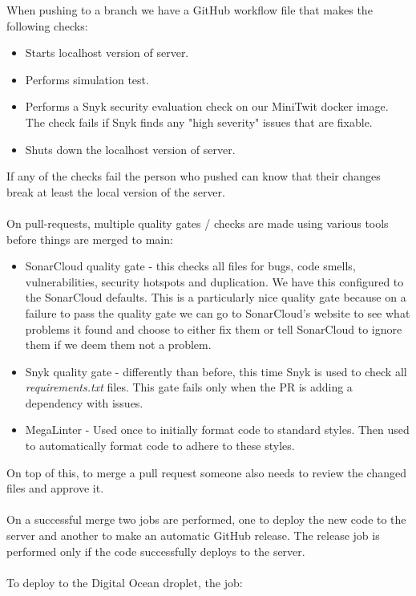 When pushing to a branch we have a GitHub workflow file that makes the following checks:

\begin{itemize}
    \item Starts localhost version of server.
    \item Performs simulation test.
    \item Performs a Snyk security evaluation check on our MiniTwit docker image. The check fails if Snyk finds any "high severity" issues that are fixable.
    \item Shuts down the localhost version of server.
\end{itemize}

If any of the checks fail the person who pushed can know that their changes break at least the local version of the server.
\\\\
On pull-requests, multiple quality gates / checks are made using various tools before things are merged to main:

\begin{itemize}
    \item SonarCloud quality gate - this checks all files for bugs, code smells, vulnerabilities, security hotspots and duplication. We have this configured to the SonarCloud defaults. This is a particularly nice quality gate because on a failure to pass the quality gate we can go to SonarCloud's website to see what problems it found and choose to either fix them or tell SonarCloud to ignore them if we deem them not a problem.
    \item Snyk quality gate - differently than before, this time Snyk is used to check all \textit{requirements.txt} files. This gate fails only when the PR is adding a dependency with issues.
    \item MegaLinter - Used once to initially format code to standard styles. Then used to automatically format code to adhere to these styles.
\end{itemize}

On top of this, to merge a pull request someone also needs to review the changed files and approve it.
\\\\
On a successful merge two jobs are performed, one to deploy the new code to the server and another to make an automatic GitHub release. The release job is performed only if the code successfully deploys to the server.
\\\\
To deploy to the Digital Ocean droplet, the job:

